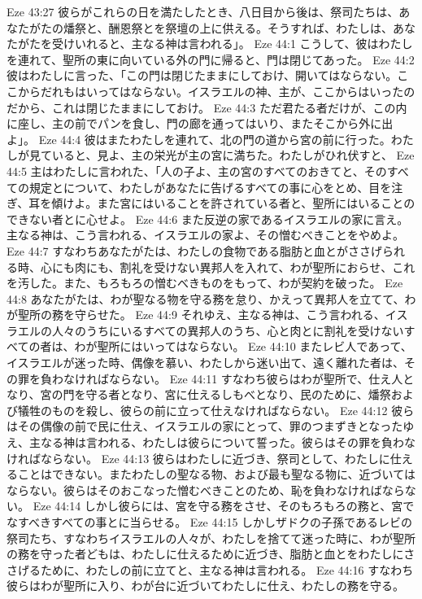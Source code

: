 Eze 43:27  彼らがこれらの日を満たしたとき、八日目から後は、祭司たちは、あなたがたの燔祭と、酬恩祭とを祭壇の上に供える。そうすれば、わたしは、あなたがたを受けいれると、主なる神は言われる」。
Eze 44:1  こうして、彼はわたしを連れて、聖所の東に向いている外の門に帰ると、門は閉じてあった。
Eze 44:2  彼はわたしに言った、「この門は閉じたままにしておけ、開いてはならない。ここからだれもはいってはならない。イスラエルの神、主が、ここからはいったのだから、これは閉じたままにしておけ。
Eze 44:3  ただ君たる者だけが、この内に座し、主の前でパンを食し、門の廊を通ってはいり、またそこから外に出よ」。
Eze 44:4  彼はまたわたしを連れて、北の門の道から宮の前に行った。わたしが見ていると、見よ、主の栄光が主の宮に満ちた。わたしがひれ伏すと、
Eze 44:5  主はわたしに言われた、「人の子よ、主の宮のすべてのおきてと、そのすべての規定とについて、わたしがあなたに告げるすべての事に心をとめ、目を注ぎ、耳を傾けよ。また宮にはいることを許されている者と、聖所にはいることのできない者とに心せよ。
Eze 44:6  また反逆の家であるイスラエルの家に言え。主なる神は、こう言われる、イスラエルの家よ、その憎むべきことをやめよ。
Eze 44:7  すなわちあなたがたは、わたしの食物である脂肪と血とがささげられる時、心にも肉にも、割礼を受けない異邦人を入れて、わが聖所におらせ、これを汚した。また、もろもろの憎むべきものをもって、わが契約を破った。
Eze 44:8  あなたがたは、わが聖なる物を守る務を怠り、かえって異邦人を立てて、わが聖所の務を守らせた。
Eze 44:9  それゆえ、主なる神は、こう言われる、イスラエルの人々のうちにいるすべての異邦人のうち、心と肉とに割礼を受けないすべての者は、わが聖所にはいってはならない。
Eze 44:10  またレビ人であって、イスラエルが迷った時、偶像を慕い、わたしから迷い出て、遠く離れた者は、その罪を負わなければならない。
Eze 44:11  すなわち彼らはわが聖所で、仕え人となり、宮の門を守る者となり、宮に仕えるしもべとなり、民のために、燔祭および犠牲のものを殺し、彼らの前に立って仕えなければならない。
Eze 44:12  彼らはその偶像の前で民に仕え、イスラエルの家にとって、罪のつまずきとなったゆえ、主なる神は言われる、わたしは彼らについて誓った。彼らはその罪を負わなければならない。
Eze 44:13  彼らはわたしに近づき、祭司として、わたしに仕えることはできない。またわたしの聖なる物、および最も聖なる物に、近づいてはならない。彼らはそのおこなった憎むべきことのため、恥を負わなければならない。
Eze 44:14  しかし彼らには、宮を守る務をさせ、そのもろもろの務と、宮でなすべきすべての事とに当らせる。
Eze 44:15  しかしザドクの子孫であるレビの祭司たち、すなわちイスラエルの人々が、わたしを捨てて迷った時に、わが聖所の務を守った者どもは、わたしに仕えるために近づき、脂肪と血とをわたしにささげるために、わたしの前に立てと、主なる神は言われる。
Eze 44:16  すなわち彼らはわが聖所に入り、わが台に近づいてわたしに仕え、わたしの務を守る。
